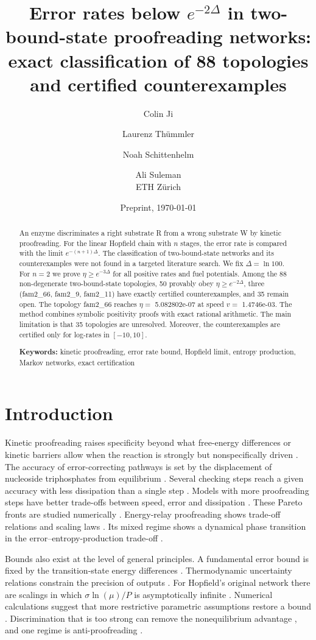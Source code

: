 \documentclass[11pt]{article}
\title{Error rates below $e^{-2\Delta}$ in two-bound-state proofreading networks: exact classification of 88 topologies and certified counterexamples}
\author{Colin Ji \and Laurenz Thümmler \and Noah Schittenhelm \and Ali Suleman\\[2pt] \small ETH Zürich}
\date{Preprint, \today}
\theoremstyle{definition}\newtheorem{definition}[theorem]{Definition}\newtheorem{example}[theorem]{Example}
\begin{document}
\maketitle
\begin{abstract}
An enzyme discriminates a right substrate R from a wrong substrate W by kinetic proofreading. For the linear Hopfield chain with \(n\) stages, the error rate is compared with the limit \(e^{-(n+1)\Delta}\). The classification of two-bound-state networks and its counterexamples were not found in a targeted literature search. We fix \(\Delta=\ln 100\). For \(n=2\) we prove \(\eta\ge e^{-3\Delta}\) for all positive rates and fuel potentials. Among the 88 non-degenerate two-bound-state topologies, 50 provably obey \(\eta\ge e^{-2\Delta}\), three (fam2\_66, fam2\_9, fam2\_11) have exactly certified counterexamples, and 35 remain open. The topology fam2\_66 reaches \(\eta=\) 5.082802e-07 at speed \(v=\) 1.4746e-03. The method combines symbolic positivity proofs with exact rational arithmetic. The main limitation is that 35 topologies are unresolved. Moreover, the counterexamples are certified only for log-rates in \([-10,10]\).

\par\medskip\noindent\textbf{Keywords:} kinetic proofreading, error rate bound, Hopfield limit, entropy production, Markov networks, exact certification
\end{abstract}
\section{Introduction}\label{introduction}

Kinetic proofreading raises specificity beyond what free-energy differences or kinetic barriers allow when the reaction is strongly but nonspecifically driven \cite{Hopfield19744135}. The accuracy of error-correcting pathways is set by the displacement of nucleoside triphosphates from equilibrium \cite{Ehrenberg19800636}. Several checking steps reach a given accuracy with less dissipation than a single step \cite{Ehrenberg19800636}. Models with more proofreading steps have better trade-offs between speed, error and dissipation \cite{Chiuchiu2023c757}. These Pareto fronts are studied numerically \cite{Chiuchiu2023c757}. Energy-relay proofreading shows trade-off relations and scaling laws \cite{Berx20240232}. Its mixed regime shows a dynamical phase transition in the error--entropy-production trade-off \cite{Berx20240232}.

Bounds also exist at the level of general principles. A fundamental error bound is fixed by the transition-state energy differences \cite{Yu202118v2,Yu20220883}. Thermodynamic uncertainty relations constrain the precision of outputs \cite{Barato20158101}. For Hopfield's original network there are scalings in which \(\sigma\ln(\mu)/P\) is asymptotically infinite \cite{Wong201738v1}. Numerical calculations suggest that more restrictive parametric assumptions restore a bound \cite{Wong201738v1}. Discrimination that is too strong can remove the nonequilibrium advantage \cite{Banerjee20262257}, and one regime is anti-proofreading \cite{Banerjee20262257}.
\end{document}
